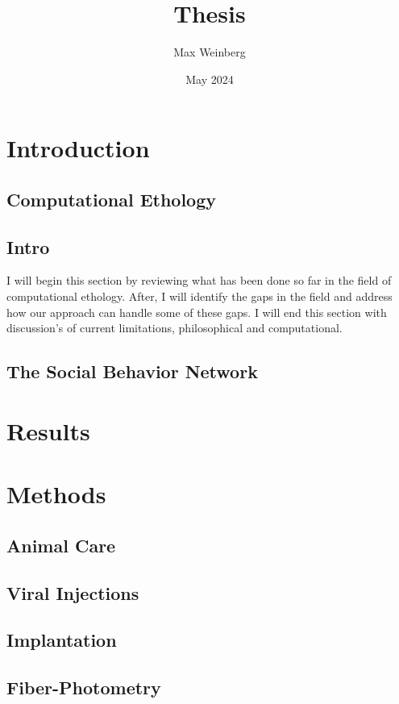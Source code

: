 \documentclass[12pt,english]{article}
\title{Thesis}
\author{Max Weinberg}
\date{May 2024}
\begin{document}
\maketitle
\section{Introduction}
\subsection{Computational Ethology}
\subsection{Intro}
I will begin this section by reviewing what has been done so far in the field of computational ethology. After, I will identify the gaps in the field and address how our approach can handle some of these gaps. I will end this section with discussion's of current limitations, philosophical and computational. 


\subsection{The Social Behavior Network}

\section{Results}

\section{Methods}

\subsection{Animal Care}

\subsection{Viral Injections}

\subsection{Implantation}

\subsection{Fiber-Photometry}
\end{document}
